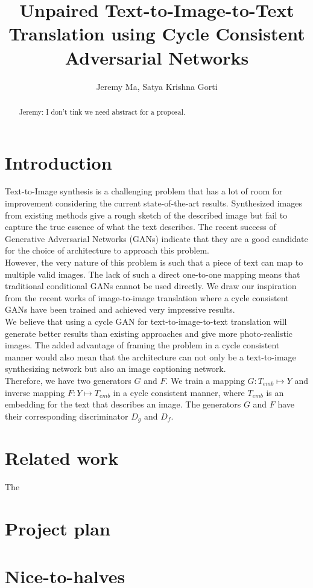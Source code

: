 \documentclass[]{article}
\title{Unpaired Text-to-Image-to-Text Translation using Cycle Consistent Adversarial Networks}
\author{Jeremy Ma, Satya Krishna Gorti}
\date{}
\begin{document}
\maketitle

\begin{abstract}
Jeremy: I don't tink we need abstract for a proposal.
\end{abstract}

\section{Introduction}

Text-to-Image synthesis is a challenging problem that has a lot of room for improvement considering the current state-of-the-art results. Synthesized images from existing methods give a rough sketch of the described image but fail to capture the true essence of what the text describes. The recent success of Generative Adversarial Networks (GANs) \cite{goodfellow2014generative} indicate that they are a good candidate for the choice of architecture to approach this problem.
\\

However, the very nature of this problem is such that a piece of text can map to multiple valid images. The lack of such a direct one-to-one mapping means that traditional conditional GANs \cite{mirza2014conditional} cannot be used directly. We draw our inspiration from the recent works of image-to-image translation \cite{liu2017unsupervised}\cite{zhu2017unpaired} where a cycle consistent GANs have been trained and achieved very impressive results.
\\

We believe that using a cycle GAN for text-to-image-to-text translation will generate better results than existing approaches and give more photo-realistic images. The added advantage of framing the problem in a cycle consistent manner would also mean that the architecture can not only be a text-to-image synthesizing network but also an image captioning network.
\\

Therefore, we have two generators $G$ and $F$. We train a mapping $G: T_{emb} \mapsto Y$ and inverse mapping $F: Y \mapsto T_{emb}$ in a cycle consistent manner, where $T_{emb}$ is an embedding for the text that describes an image. The generators $G$ and $F$ have their corresponding discriminator $D_g$ and $D_f$.

\section{Related work}

The 

\section{Project plan}

\section{Nice-to-halves}



\end{document}
